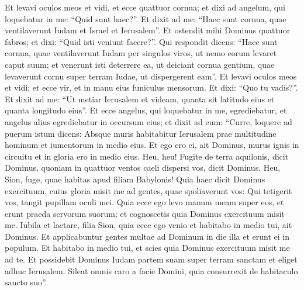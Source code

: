 \begin{biblechapter}  
\verse Et levavi oculos meos et vidi, et ecce quattuor cornua; 
\verse et dixi ad angelum, qui loquebatur in me: “Quid sunt haec?”. Et dixit ad me: “Haec sunt cornua, quae ventilaverunt Iudam et Israel et Ierusalem”. 
\verse Et ostendit mihi Dominus quattuor fabros; 
\verse et dixi: “Quid isti veniunt facere?”. Qui respondit dicens: “Haec sunt cornua, quae ventilaverunt Iudam per singulos viros, ut nemo eorum levaret caput suum; et venerunt isti deterrere ea, ut deiciant cornua gentium, quae levaverunt cornu super terram Iudae, ut dispergerent eam”. 
\verse Et levavi oculos meos et vidi; et ecce vir, et in manu eius funiculus mensorum. 
\verse Et dixi: “Quo tu vadis?”. Et dixit ad me: “Ut metiar Ierusalem et videam, quanta sit latitudo eius et quanta longitudo eius”. 
\verse Et ecce angelus, qui loquebatur in me, egrediebatur, et angelus alius egrediebatur in occursum eius; 
\verse et dixit ad eum: “Curre, loquere ad puerum istum dicens: Absque muris habitabitur Ierusalem prae multitudine hominum et iumentorum in medio eius. 
\verse Et ego ero ei, ait Dominus, murus ignis in circuitu et in gloria ero in medio eius. 
\verse Heu, heu! Fugite de terra aquilonis, dicit Dominus, quoniam in quattuor ventos caeli dispersi vos, dicit Dominus. 
\verse Heu, Sion, fuge, quae habitas apud filiam Babylonis! 
\verse Quia haec dicit Dominus exercituum, cuius gloria misit me ad gentes, quae spoliaverunt vos: Qui tetigerit vos, tangit pupillam oculi mei. 
\verse Quia ecce ego levo manum meam super eos, et erunt praeda servorum suorum; et cognoscetis quia Dominus exercituum misit me. 
\verse Iubila et laetare, filia Sion, quia ecce ego venio et habitabo in medio tui, ait Dominus. 
\verse Et applicabuntur gentes multae ad Dominum in die illa et erunt ei in populum. Et habitabo in medio tui, et scies quia Dominus exercituum misit me ad te. 
\verse Et possidebit Dominus Iudam partem suam super terram sanctam et eliget adhuc Ierusalem. 
\verse Sileat omnis caro a facie Domini, quia consurrexit de habitaculo sancto suo”. 
\end{biblechapter}

